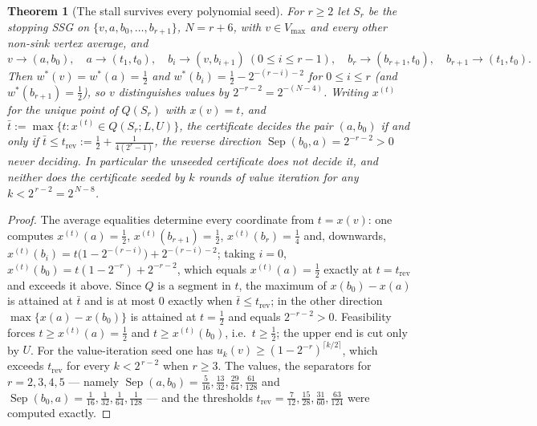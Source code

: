\documentclass[11pt]{article}
\theoremstyle{plain}
\newtheorem{theorem}{Theorem}[section]
\theoremstyle{definition}
\newcommand{\Vmax}{V_{\max}}
\begin{document}
\begin{theorem}[The stall survives every polynomial seed]\label{thm:transport-barrier}
For $r\ge2$ let $S_r$ be the stopping SSG on
$\{v,a,b_0,\dots,b_{r+1}\}$, $N=r+6$, with $v\in\Vmax$ and every other
non-sink vertex average, and
\[
  v\to(a,b_0),\quad a\to(t_1,t_0),\quad b_i\to(v,b_{i+1})\ (0\le i\le r-1),
  \quad b_r\to(b_{r+1},t_0),\quad b_{r+1}\to(t_1,t_0).
\]
Then $w^\ast(v)=w^\ast(a)=\tfrac12$ and
$w^\ast(b_i)=\tfrac12-2^{-(r-i)-2}$ for $0\le i\le r$ (and
$w^\ast(b_{r+1})=\tfrac12$), so $v$ distinguishes values by
$2^{-r-2}=2^{-(N-4)}$. Writing $x^{(t)}$ for the unique point of $Q(S_r)$
with $x(v)=t$, and $\bar t:=\max\{t:x^{(t)}\in Q(S_r;L,U)\}$, the
certificate decides the pair $(a,b_0)$ if and only if
$\bar t\le t_{\mathrm{rev}}:=\tfrac12+\tfrac1{4(2^{r}-1)}$, the reverse
direction $\operatorname{Sep}(b_0,a)=2^{-r-2}>0$ never deciding. In particular the
unseeded certificate does not decide it, and neither does the certificate
seeded by $k$ rounds of value iteration for any $k<2^{\,r-2}=2^{\,N-8}$.
\end{theorem}

\begin{proof}
The average equalities determine every coordinate from $t=x(v)$: one
computes $x^{(t)}(a)=\tfrac12$, $x^{(t)}(b_{r+1})=\tfrac12$,
$x^{(t)}(b_r)=\tfrac14$ and, downwards,
$x^{(t)}(b_i)=t\bigl(1-2^{-(r-i)}\bigr)+2^{-(r-i)-2}$; taking $i=0$,
$x^{(t)}(b_0)=t(1-2^{-r})+2^{-r-2}$, which equals $x^{(t)}(a)=\tfrac12$
exactly at $t=t_{\mathrm{rev}}$ and exceeds it above. Since $Q$ is a
segment in $t$, the maximum of $x(b_0)-x(a)$ is attained at $\bar t$ and
is at most $0$ exactly when $\bar t\le t_{\mathrm{rev}}$; in the other
direction $\max\{x(a)-x(b_0)\}$ is attained at $t=\tfrac12$ and equals
$2^{-r-2}>0$. Feasibility forces
$t\ge x^{(t)}(a)=\tfrac12$ and $t\ge x^{(t)}(b_0)$, i.e.\ $t\ge\tfrac12$;
the upper end is cut only by $U$. For the value-iteration seed one has
$u_k(v)\ge(1-2^{-r})^{\lceil k/2\rceil}$, which exceeds
$t_{\mathrm{rev}}$ for every $k<2^{\,r-2}$ when $r\ge3$. The values, the
separators for $r=2,3,4,5$ --- namely $\operatorname{Sep}(a,b_0)=\tfrac5{16},\tfrac{13}{32},\tfrac{29}{64},\tfrac{61}{128}$
and $\operatorname{Sep}(b_0,a)=\tfrac1{16},\tfrac1{32},\tfrac1{64},\tfrac1{128}$ ---
and the thresholds $t_{\mathrm{rev}}=\tfrac7{12},\tfrac{15}{28},\tfrac{31}{60},\tfrac{63}{124}$
were computed exactly.
\end{proof}
\end{document}
